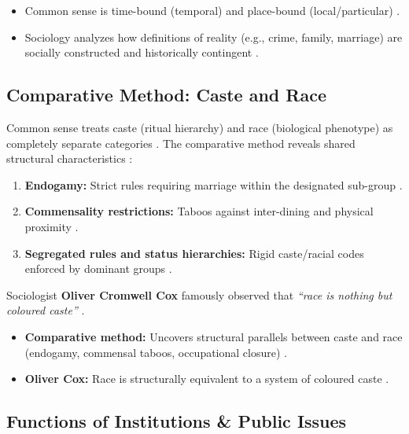 \begin{QuickRevision}
\begin{itemize}
    \item Common sense is time-bound (temporal) and place-bound (local/particular) .
    \item Sociology analyzes how definitions of reality (e.g., crime, family, marriage) are socially constructed and historically contingent .
\end{itemize}
\end{QuickRevision}

\subsection{Comparative Method: Caste and Race}

\begin{ComparisonBox}
Common sense treats caste (ritual hierarchy) and race (biological phenotype) as completely separate categories . The comparative method reveals shared structural characteristics :
\begin{enumerate}
    \item \textbf{Endogamy:} Strict rules requiring marriage within the designated sub-group .
    \item \textbf{Commensality restrictions:} Taboos against inter-dining and physical proximity .
    \item \textbf{Segregated rules and status hierarchies:} Rigid caste/racial codes enforced by dominant groups .
\end{enumerate}
Sociologist \textbf{Oliver Cromwell Cox} famously observed that \textit{``race is nothing but coloured caste''} .
\end{ComparisonBox}

\begin{QuickRevision}
\begin{itemize}
    \item \textbf{Comparative method:} Uncovers structural parallels between caste and race (endogamy, commensal taboos, occupational closure) .
    \item \textbf{Oliver Cox:} Race is structurally equivalent to a system of coloured caste .
\end{itemize}
\end{QuickRevision}

\subsection{Functions of Institutions \& Public Issues}

